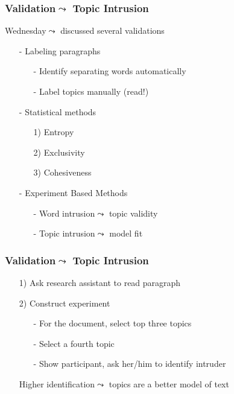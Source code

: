 \documentclass{beamer}
\numberwithin{equation}{section}
\begin{document}
\begin{frame}
\frametitle{Validation$\leadsto$ Topic Intrusion}

Wednesday$\leadsto$ discussed several validations

\begin{itemize}
\item[-] Labeling paragraphs
\begin{itemize}
\item[-] Identify separating words automatically
\item[-] Label topics manually (read!)
\end{itemize}
\item[-] Statistical methods
\begin{itemize}
\item[1)] Entropy
\item[2)] Exclusivity
\item[3)] Cohesiveness
\end{itemize}
\item[-] Experiment Based Methods
\begin{itemize}
\item[-] Word intrusion$\leadsto$ topic validity
\item[-] \alert{Topic intrusion}$\leadsto$ model fit
\end{itemize}

\end{itemize}



\end{frame}


\begin{frame}
\frametitle{Validation$\leadsto$ Topic Intrusion}


\begin{itemize}
\item[1)] Ask research assistant to read paragraph
\item[2)] Construct experiment
\begin{itemize}
\item[-] For the document, select top three topics
\item[-] Select a fourth topic
\item[-] Show participant, ask her/him to identify intruder
\end{itemize}

Higher identification$\leadsto$ topics are a better model of text


\end{itemize}

\end{frame}
\end{document}
